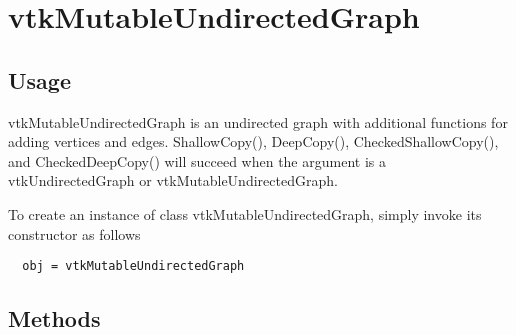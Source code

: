 \section{vtkMutableUndirectedGraph}

\subsection{Usage}

 vtkMutableUndirectedGraph is an undirected graph with additional functions
 for adding vertices and edges. ShallowCopy(), DeepCopy(), CheckedShallowCopy(),
 and CheckedDeepCopy() will succeed when the argument is a vtkUndirectedGraph
 or vtkMutableUndirectedGraph.


To create an instance of class vtkMutableUndirectedGraph, simply
invoke its constructor as follows
\begin{verbatim}
  obj = vtkMutableUndirectedGraph
\end{verbatim}
\subsection{Methods}

